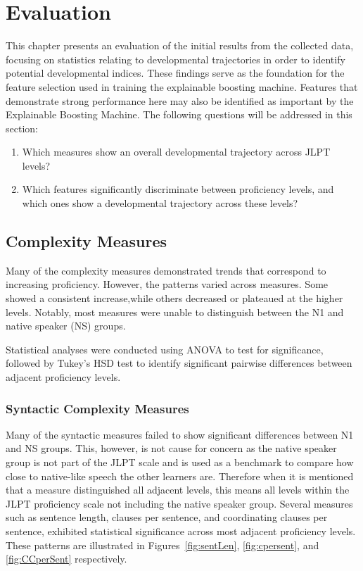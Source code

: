 \chapter{Evaluation} 
This chapter presents an evaluation of the initial results from the collected data, focusing on statistics relating to
developmental trajectories in order to identify potential developmental indices. These findings serve as the
foundation
for the feature selection used in training the explainable boosting machine. Features that demonstrate strong
performance here may also be identified as important by the Explainable Boosting Machine. The following questions
will be
addressed in this
section:

\begin{enumerate}
    \item Which measures show an overall developmental trajectory across JLPT levels?
    \item Which features significantly discriminate between proficiency levels, and which ones show a developmental
    trajectory across these levels?
\end{enumerate}

\section{Complexity Measures}

Many of the complexity measures demonstrated trends that correspond to increasing proficiency. However, the patterns
varied across measures. Some showed a consistent increase,while others
decreased or plateaued at the
higher levels. Notably, most measures were unable to distinguish between the N1 and native speaker (NS) groups.

Statistical analyses were conducted using ANOVA to test for significance, followed by Tukey's HSD test to identify
significant pairwise differences between adjacent proficiency levels.

\subsection{Syntactic Complexity Measures}


Many of the syntactic measures failed to show significant differences between N1 and NS groups. This, however, is not
cause for concern as the native speaker group is not part of the JLPT scale and is used as a benchmark to
compare how close to native-like speech the other learners are. Therefore when it is mentioned that a measure
distinguished all adjacent levels, this means all levels within the JLPT proficiency scale not including the native
speaker group.
Several measures
such as sentence length, clauses per sentence, and coordinating clauses per sentence, exhibited statistical significance
across most
adjacent proficiency levels. These patterns are illustrated in Figures~\ref{fig:sentLen}, \ref{fig:cpersent}, and \ref{fig:CCperSent} respectively.

